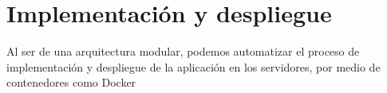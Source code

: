 \chapter{Implementación y despliegue}
Al ser de una arquitectura modular, podemos automatizar el proceso de implementación y despliegue de la aplicación en los servidores, por medio de contenedores como Docker

